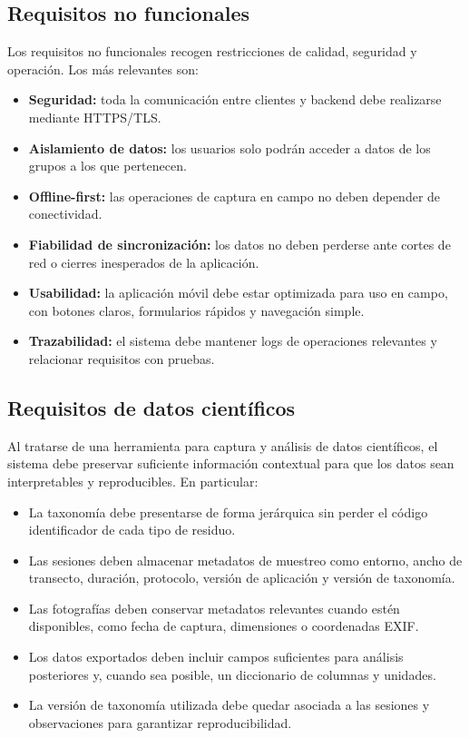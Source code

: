 \subsection{Requisitos no funcionales}

Los requisitos no funcionales recogen restricciones de calidad, seguridad y
operación. Los más relevantes son:

\begin{itemize}
  \item \textbf{Seguridad:} toda la comunicación entre clientes y backend debe
    realizarse mediante HTTPS/TLS.
  \item \textbf{Aislamiento de datos:} los usuarios solo podrán acceder a datos de
    los grupos a los que pertenecen.
  \item \textbf{Offline-first:} las operaciones de captura en campo no deben depender
    de conectividad.
  \item \textbf{Fiabilidad de sincronización:} los datos no deben perderse ante
    cortes de red o cierres inesperados de la aplicación.
  \item \textbf{Usabilidad:} la aplicación móvil debe estar optimizada para uso en
    campo, con botones claros, formularios rápidos y navegación simple.
  \item \textbf{Trazabilidad:} el sistema debe mantener logs de operaciones
    relevantes y relacionar requisitos con pruebas.
\end{itemize}

\subsection{Requisitos de datos científicos}

Al tratarse de una herramienta para captura y análisis de datos científicos, el
sistema debe preservar suficiente información contextual para que los datos sean
interpretables y reproducibles. En particular:

\begin{itemize}
  \item La taxonomía debe presentarse de forma jerárquica sin perder el código
    identificador de cada tipo de residuo.
  \item Las sesiones deben almacenar metadatos de muestreo como entorno, ancho de
    transecto, duración, protocolo, versión de aplicación y versión de taxonomía.
  \item Las fotografías deben conservar metadatos relevantes cuando estén
    disponibles, como fecha de captura, dimensiones o coordenadas EXIF.
  \item Los datos exportados deben incluir campos suficientes para análisis
    posteriores y, cuando sea posible, un diccionario de columnas y unidades.
  \item La versión de taxonomía utilizada debe quedar asociada a las sesiones y
    observaciones para garantizar reproducibilidad.
\end{itemize}


